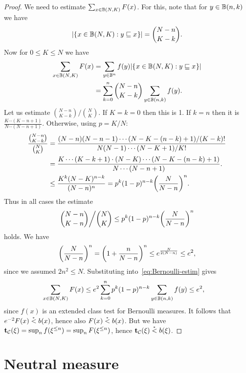 \begin{proof}
We need to estimate \( \sum_{x\in\mathbb{B}(N,K)} F(x) \).
For this, note that for \( y\in\mathbb{B}(n,k) \) we have
 \begin{align}\label{eq:hyper}
   |\mathopen\{\mskip 1mu x\in\mathbb{B}(N,K):y\sqsubseteq x\mskip 1mu\mathclose\}| = \binom{N-n}{K-k}.
 \end{align}
Now for \( 0\le K\le N \) we have
 \begin{equation}\label{eq:Bernoulli-estim}
 \begin{aligned}
      \sum_{x\in\mathbb{B}(N,K)} F(x) &= 
     \sum_{y\in\mathbb{B}^{n}}f(y)|\mathopen\{\mskip 1mu x\in\mathbb{B}(N,K):y\sqsubseteq x\mskip 1mu\mathclose\}|
\\ &= \sum_{k=0}^{n}\binom{N-n}{K-k}\sum_{y\in\mathbb{B}(n,k)}f(y).
 \end{aligned}\end{equation}
Let us estimate \( \binom{N-n}{K-k}\big/\binom{N}{K} \).
If \( K=k=0 \) then this is 1.
If \( k=n \) then it is \( \frac{K\dotsm(K-n+1)}{N\dotsm(N-n+1)} \).
Otherwise, using \( p=K/N \):
\begin{align}\nonumber
\frac{\binom{N-n}{K-k}}{\binom{N}{K}}
 &= \frac{(N-n)(N-n-1)\dotsm(N-K-(n-k)+1)/(K-k)!}{N(N-1)\dotsm(N-K+1)/K!}
\\\nonumber  &= \frac{K\dotsm(K-k+1)\cdot(N-K)\dotsm(N-K-(n-k)+1)}{N\dotsm(N-n+1)}.
\\\label{eq:Bernoulli-estim-1}
  &\le \frac{K^{k}(N-K)^{n-k}}{(N-n)^{n}} = p^{k}(1-p)^{n-k}{\left( \frac{N}{N-n}\right)}^{n}.
 \end{align}
Thus in all cases the estimate
 \begin{align*}
\binom{N-n}{K-n}\bigg/\binom{N}{K} \le p^{k}(1-p)^{n-k}{\left( \frac{N}{N-n}\right)}^{n}
 \end{align*}
holds.
We have
 \begin{align*}
{\left( \frac{N}{N-n}\right)}^{n} ={\left( 1+\frac{n}{N-n}\right)}^{n}
  \le e^{\frac{N}{2(N-n)}} \le e^{2},
 \end{align*}
since we assumed \( 2n^{2}\le N \).
Substituting into~\eqref{eq:Bernoulli-estim} gives
 \begin{align*}
  \sum_{x\in\mathbb{B}(N,K)} F(x)
  &\le e^{2}\sum_{k=0}^{n}p^{k}(1-p)^{n-k}\sum_{y\in\mathbb{B}(n,k)}f(y) \le e^{2},
 \end{align*}
since \( f(x) \) is an extended class test for Bernoulli measures.
It follows that \( e^{-2}F(x)\stackrel{{}_*}{<} b(x) \), hence also \( F(x) \stackrel{{}_*}{<} b(x) \).
But we have \( \mathbf{t}_{\mathcal{C}}(\xi)=\sup_{n}f(\xi^{\le n}) = \sup_{n}F(\xi^{\le n}) \), hence
\( \mathbf{t}_{\mathcal{C}}(\xi) \stackrel{{}_*}{<} b(\xi) \).
 \end{proof}


\section{Neutral measure}\label{sec:neutral}

